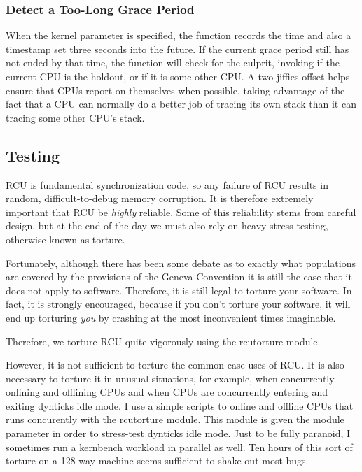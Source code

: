 \subsubsection{Detect a Too-Long Grace Period}
\label{app:rcuimpl:rcutree:Detect a Too-Long Grace Period}

When the  kernel parameter
is specified, the  function
records the time and also a timestamp set three seconds into the future.
If the current grace period still has not ended by that time, the
 function will check for the culprit,
invoking  if the current CPU is the
holdout, or  if it is some other CPU.
A two-jiffies offset helps ensure that CPUs report on themselves
when possible, taking advantage of the fact that a CPU can normally
do a better job of tracing its own stack than it can tracing some other
CPU's stack.

\subsection{Testing}
\label{app:rcuimpl:rcutree:Testing}

RCU is fundamental synchronization code, so any failure of RCU
results in random, difficult-to-debug memory corruption.
It is therefore extremely important that RCU be \emph{highly} reliable.
Some of this reliability stems from careful design, but at the
end of the day we must also rely on heavy stress testing, otherwise
known as torture.

Fortunately, although there has been some debate as to exactly
what populations are covered by the provisions of the Geneva Convention
it is still the case that it does not apply to software.
Therefore, it is still legal to torture your software.
In fact, it is strongly encouraged, because if you don't torture your
software, it will end up torturing \emph{you} by crashing at the most
inconvenient times imaginable.

Therefore, we torture RCU quite vigorously using the rcutorture module.

However, it is not sufficient to torture the common-case uses of RCU.
It is also necessary to torture it in unusual situations, for example,
when concurrently onlining and offlining CPUs and when CPUs are concurrently
entering and exiting dynticks idle mode.
I use a simple scripts to online and offline CPUs that runs concurently
with the rcutorture module.
This module is given the  module parameter in order
to stress-test dynticks idle mode.
Just to be fully paranoid, I sometimes run a kernbench workload in parallel
as well.
Ten hours of this sort of torture on a 128-way machine seems sufficient
to shake out most bugs.

